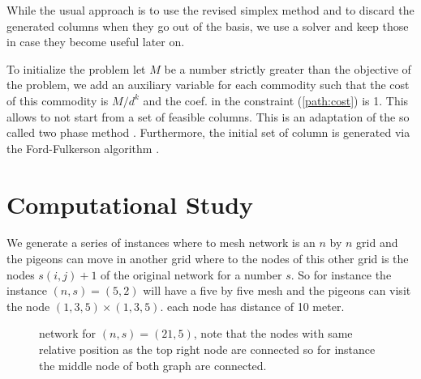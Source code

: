 \documentclass{article}
\begin{document}
	While the usual approach is to use the revised simplex method and to discard the generated columns when they go out of the basis, we use a solver and keep those in case they become useful later on. 
	
	To initialize the problem let $M$ be a number strictly greater than the objective of the problem, we add an auxiliary variable for each commodity such that the cost of this commodity is $M/d^k$ and the coef. in the constraint (\ref{path:cost}) is 1. This allows to not start from a set of feasible columns. This is an adaptation of the so called two phase method \parencite{wagnerTwoPhaseMethodSimplex1956}. Furthermore, the initial set of column is generated via the Ford-Fulkerson algorithm \parencite{fordMaximalFlowNetwork1956}. 
	
	\section{Computational Study}
	
	We generate a series of instances where to mesh network is an $n$ by $n$ grid and the pigeons can move in another grid where to the nodes of this other grid is the nodes $s(i, j) + 1$ of the original network for a number $s$. So for instance the instance $(n, s)=(5, 2)$ will have a five by five mesh and the pigeons can visit the node $(1, 3, 5) \times (1, 3, 5)$.  each node has distance of 10 meter.
	
	\begin{figure}[h]
		\centering
		\qquad
		\caption{network for $(n, s) = (21, 5)$, note that the nodes with same relative position as the top right node are connected so for instance the middle node of both graph are connected.}
	\end{figure}
	
\end{document}
